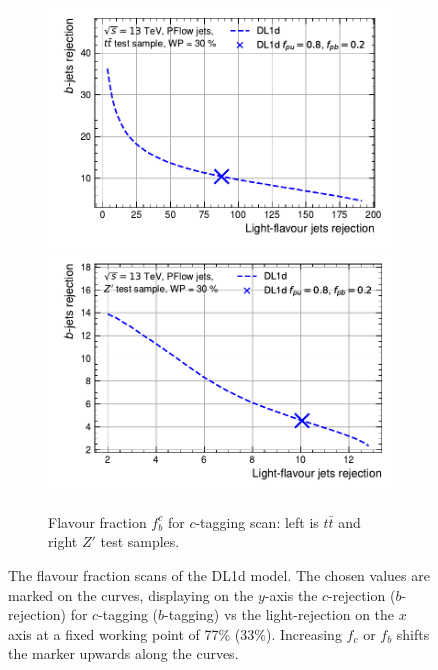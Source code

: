 \begin{figure}[h!]
\begin{subfigure}[b]{0.98\textwidth}
    \includegraphics[scale=0.65]{Images/FTAG/DL1d/extra_plots/contour_fraction_c_ttbar_299.pdf}
    \includegraphics[scale=0.65]{Images/FTAG/DL1d/extra_plots/contour_fraction_c_zp_299.pdf}
    \caption{Flavour fraction $f_b^c$ for $c$-tagging scan: left is $t\bar{t}$ and right $Z'$ test samples.} 
    \label{fig:DL1dscanfc}
\end{subfigure}
  \caption{The flavour fraction scans of the DL1d model. The chosen values are marked on the curves, displaying on the $y$-axis the $c$-rejection ($b$-rejection) for $c$-tagging ($b$-tagging) vs the light-rejection on the $x$ axis at a fixed working point of 77\% (33\%). Increasing $f_c$ or $f_b$ shifts the marker upwards along the curves. }
  \label{fig:DL1dscanf}
\end{figure} 

